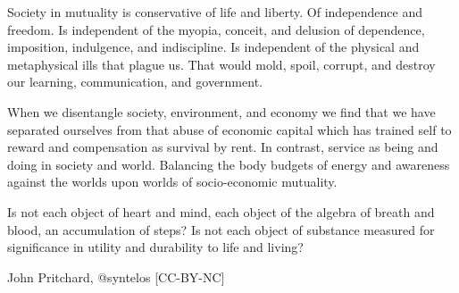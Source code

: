 Society in mutuality is conservative of life and liberty.  Of
independence and freedom.  Is independent of the myopia, conceit, and
delusion of dependence, imposition, indulgence, and indiscipline.  Is
independent of the physical and metaphysical ills that plague us.
That would mold, spoil, corrupt, and destroy our learning,
communication, and government.

When we disentangle society, environment, and economy we find that we
have separated ourselves from that abuse of economic capital which has
trained self to reward and compensation as survival by rent.  In
contrast, service as being and doing in society and world.  Balancing
the body budgets of energy and awareness against the worlds upon
worlds of socio-economic mutuality.

Is not each object of heart and mind, each object of the algebra of
breath and blood, an accumulation of steps?  Is not each object of
substance measured for significance in utility and durability to life
and living?

{\tail John Pritchard, @syntelos [CC-BY-NC]}

\bye
